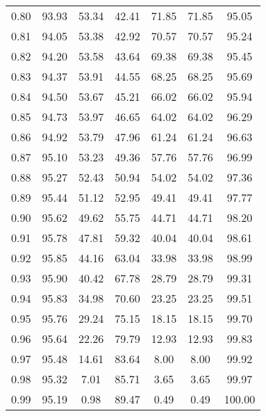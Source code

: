 \begin{tabular}{|c|c|c|c|c|c|c|}
      0.80 &     93.93 &     53.34 &      42.41 &   71.85 &      71.85 &         95.05 \\
      0.81 &     94.05 &     53.38 &      42.92 &   70.57 &      70.57 &         95.24 \\
      0.82 &     94.20 &     53.58 &      43.64 &   69.38 &      69.38 &         95.45 \\
      0.83 &     94.37 &     53.91 &      44.55 &   68.25 &      68.25 &         95.69 \\
      0.84 &     94.50 &     53.67 &      45.21 &   66.02 &      66.02 &         95.94 \\
      0.85 &     94.73 &     53.97 &      46.65 &   64.02 &      64.02 &         96.29 \\
      0.86 &     94.92 &     53.79 &      47.96 &   61.24 &      61.24 &         96.63 \\
      0.87 &     95.10 &     53.23 &      49.36 &   57.76 &      57.76 &         96.99 \\
      0.88 &     95.27 &     52.43 &      50.94 &   54.02 &      54.02 &         97.36 \\
      0.89 &     95.44 &     51.12 &      52.95 &   49.41 &      49.41 &         97.77 \\
      0.90 &     95.62 &     49.62 &      55.75 &   44.71 &      44.71 &         98.20 \\
      0.91 &     95.78 &     47.81 &      59.32 &   40.04 &      40.04 &         98.61 \\
      0.92 &     95.85 &     44.16 &      63.04 &   33.98 &      33.98 &         98.99 \\
      0.93 &     95.90 &     40.42 &      67.78 &   28.79 &      28.79 &         99.31 \\
      0.94 &     95.83 &     34.98 &      70.60 &   23.25 &      23.25 &         99.51 \\
      0.95 &     95.76 &     29.24 &      75.15 &   18.15 &      18.15 &         99.70 \\
      0.96 &     95.64 &     22.26 &      79.79 &   12.93 &      12.93 &         99.83 \\
      0.97 &     95.48 &     14.61 &      83.64 &    8.00 &       8.00 &         99.92 \\
      0.98 &     95.32 &      7.01 &      85.71 &    3.65 &       3.65 &         99.97 \\
      0.99 &     95.19 &      0.98 &      89.47 &    0.49 &       0.49 &        100.00 \\
\bottomrule
\end{tabular}
